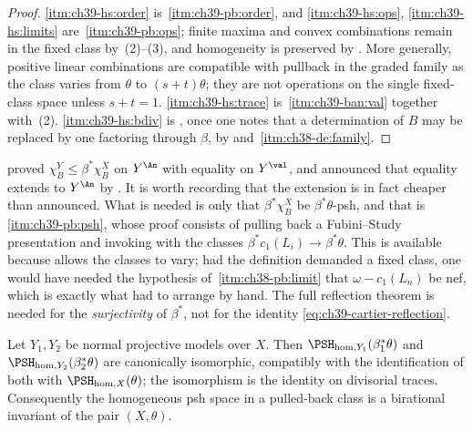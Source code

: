 \begin{proof}
\cref{itm:ch39-hs:order} is
\,\cref{itm:ch39-pb:order}, and
\cref{itm:ch39-hs:ops}, \cref{itm:ch39-hs:limits} are
\,\cref{itm:ch39-pb:ops}; finite maxima and convex
combinations remain in the fixed class by
\,(2)--(3), and homogeneity is preserved by
.  More generally, positive linear
combinations are compatible with pullback in the graded family as the class
varies from $\theta$ to $(s+t)\theta$; they are not operations on the
single fixed-class space unless $s+t=1$.
\cref{itm:ch39-hs:trace} is
\,\cref{itm:ch39-ban:val} together with
\,(2).  \cref{itm:ch39-hs:bdiv} is
, once one notes that a determination of
$B$ may be replaced by one factoring through $\beta$, by
 and
\,\cref{itm:ch38-de:family}.
\end{proof}

\begin{remark}
\label{rem:ch39-closing-the-gap}
 proved
$\chi^{Y}_B\le\beta^*\chi^X_B$ on $Y^{\An}$ with equality on
$Y^{\val}$, and  announced that equality
extends to $Y^{\An}$ by .  It is worth
recording that the extension is in fact cheaper than announced.  What is
needed is only that $\beta^*\chi^X_B$ be $\beta^*\theta$-psh, and that
is \,\cref{itm:ch39-pb:psh}, whose proof consists of
pulling back a Fubini--Study presentation and invoking
 with the classes $\beta^*c_1(L_i)\to\beta^*\theta$.
This is available because  allows the classes to vary; had
the definition demanded a fixed class, one would have needed the hypothesis
of \,\cref{itm:ch38-pb:limit} that
$\omega-c_1(L_n)$ be nef, which is exactly what
 had to arrange by hand.  The full
reflection theorem is needed for the \emph{surjectivity} of $\beta^*$, not
for the identity \eqref{eq:ch39-cartier-reflection}.
\end{remark}

\begin{corollary}
\label{cor:ch39-model-independence}
Let $Y_1,Y_2$ be normal projective models over $X$.  Then
$\PSH_{\mathrm{hom},Y_1}(\beta_1^*\theta)$ and
$\PSH_{\mathrm{hom},Y_2}(\beta_2^*\theta)$ are canonically isomorphic,
compatibly with the identification of both with
$\PSH_{\mathrm{hom},X}(\theta)$; the isomorphism is the identity on
divisorial traces.  Consequently the homogeneous psh space in a pulled-back
class is a birational invariant of the pair $(X,\theta)$.
\end{corollary}

